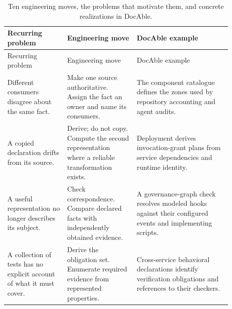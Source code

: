 {\footnotesize
\begin{longtable}{@{}p{0.24\linewidth}p{0.28\linewidth}p{0.38\linewidth}@{}}
\caption[Engineering moves at a glance]{Ten engineering moves, the problems that motivate them, and concrete realizations in DocAble.}\label{handbook-engineering-moves}\tabularnewline
\toprule
Recurring problem & Engineering move & DocAble example \\
\midrule
\endfirsthead
\toprule
Recurring problem & Engineering move & DocAble example \\
\midrule
\endhead
Different consumers disagree about the same fact. & Make one source authoritative. Assign the fact an owner and name its consumers. & The component catalogue defines the zones used by repository accounting and agent audits. \\
A copied declaration drifts from its source. & Derive; do not copy. Compute the second representation where a reliable transformation exists. & Deployment derives invocation-grant plans from service dependencies and runtime identity. \\
A useful representation no longer describes its subject. & Check correspondence. Compare declared facts with independently obtained evidence. & A governance-graph check resolves modeled hooks against their configured events and implementing scripts. \\
A collection of tests has no explicit account of what it must cover. & Derive the obligation set. Enumerate required evidence from represented properties. & Cross-service behavioral declarations identify verification obligations and references to their checkers. \\

\end{longtable}}
